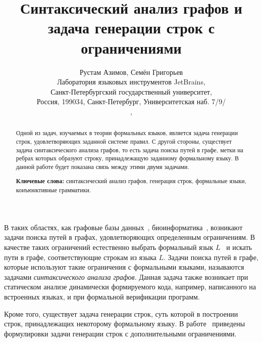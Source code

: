 \documentclass[10pt]{article}
\begin{document}
\title{Синтаксический анализ графов и задача генерации строк с ограничениями}
\author{Рустам Азимов, Семён Григорьев \\ 
Лаборатория языковых инструментов JetBrains, \\
Санкт-Петербургский государственный университет, \\
Россия, 199034, Санкт-Петербург, Университетская наб. 7/9/ \\ 
, 
}

\maketitle

\begin{abstract}
Одной из задач, изучаемых в теории формальных языков, является задача генерации строк, удовлетворяющих заданной системе правил. С другой стороны, существует задача синтаксического анализа графов, то есть задача поиска путей в графе, метки на ребрах которых образуют строку, принадлежащую заданному формальному языку. В данной работе будет показана связь между этими двумя задачами.

\vspace{1em}
\textbf{Ключевые слова:} синтаксический анализ графов, генерация строк, формальные языки, конъюнктивные грамматики.

\end{abstract}

В таких областях, как графовые базы данных~\cite{azimov-spbu-graphDB, azimov-spbu-zhang}, биоинформатика~\cite{azimov-spbu-Anderson}, возникают задачи поиска путей в графах, удовлетворяющих определенным ограничениям. В качестве таких ограничений естественно выбрать формальный язык $L$~\cite{azimov-spbu-barrett} и искать пути в графе, соответствующие строкам из языка $L$. Задачи поиска путей в графе, которые используют такие ограничения с формальными языками, называются задачами \textit{синтаксического анализа графов}. Данная задача также возникает при статическом анализе динамически формируемого кода, например, написанного на встроенных языках, и при формальной верификации программ.

Кроме того, существует задача генерации строк, суть которой в построении строк, принадлежащих некоторому формальному языку. В работе~\cite{azimov-spbu-Okhotin} приведены формулировки задачи генерации строк с дополнительными ограничениями.
\end{document}
